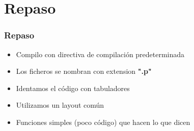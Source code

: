 \section{Repaso}

\begin{frame}
\frametitle{Repaso}

\begin{itemize}
	\item Compilo con directiva de compilación predeterminada
	\item Los ficheros se nombran con extension \textbf{".p"}
	\item Identamos el código con tabuladores
	\item Utilizamos un layout común
	\item Funciones simples (poco código) que hacen lo que dicen
\end{itemize}

\end{frame}
